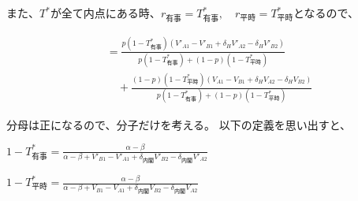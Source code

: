 \documentclass[main.tex]{subfiles}
\begin{document}
また、$T^*$が全て内点にある時、$r_{有事}=T^*_{有事}, \quad r_{平時} = T^*_{平時}$となるので、

\begin{align*}
    &= \frac{ p(1-T^*_{有事}) (V'_{A1} -V'_{B1} + \delta_H V'_{A2} - \delta_H V'_{B2})  }{ p(1-T^*_{有事})  + (1-p)(1-T^*_{平時}) }\\[1em]
    &\quad + \frac{ (1-p)(1-T^*_{平時})(V_{A1} - V_{B1} + \delta_H V_{A2} - \delta_H V_{B2} ) }{ p(1-T^*_{有事}) +  (1-p)(1-T^*_{平時}) }
\end{align*}


分母は正になるので、分子だけを考える。
以下の定義を思い出すと、

\begin{definition} \Large$1 - T^*_{有事} = \frac{ \alpha-\beta }{ \alpha-\beta + V'_{B1}-V'_{A1} + \delta_{内閣}V'_{B2} - \delta_{内閣}V'_{A2} }$ \end{definition}

\begin{definition} \Large$1 - T^*_{平時} = \frac{ \alpha-\beta }{ \alpha-\beta + V_{B1}-V_{A1} + \delta_{内閣}V_{B2} - \delta_{内閣}V_{A2} }$ \end{definition}
\end{document}
